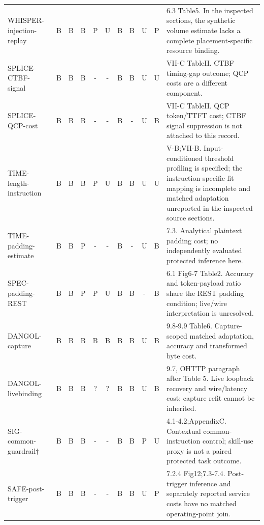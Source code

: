 \begin{longtable}{@{}p{}*{9}{c}p{}@{}}
WHISPER-\allowbreak{}injection-\allowbreak{}replay~\cite{whisperleak2025} & B & B & B & P & U & B & B & U & P & 6.3 Table5. In the inspected sections, the synthetic volume estimate lacks a complete placement-specific resource binding.\\
SPLICE-\allowbreak{}CTBF-\allowbreak{}signal~\cite{spliceleak2026} & B & B & B & - & - & B & B & U & U & VII-C TableII. CTBF timing-gap outcome; QCP costs are a different component.\\
SPLICE-\allowbreak{}QCP-\allowbreak{}cost~\cite{spliceleak2026} & B & B & B & - & - & B & - & U & B & VII-C TableII. QCP token/TTFT cost; CTBF signal suppression is not attached to this record.\\
TIME-\allowbreak{}length-\allowbreak{}instruction~\cite{timewilltell2024} & B & B & B & P & U & B & B & U & U & V-B;VII-B. Input-conditioned threshold profiling is specified; the instruction-specific fit mapping is incomplete and matched adaptation unreported in the inspected source sections.\\
TIME-\allowbreak{}padding-\allowbreak{}estimate~\cite{timewilltell2024} & B & B & P & - & - & B & - & U & B & 7.3. Analytical plaintext padding cost; no independently evaluated protected inference here.\\
SPEC-\allowbreak{}padding-\allowbreak{}REST~\cite{wei2024speculation} & B & B & P & P & U & B & B & - & B & 6.1 Fig6-7 Table2. Accuracy and token-payload ratio share the REST padding condition; live/wire interpretation is unresolved.\\
DANGOL-\allowbreak{}capture~\cite{dangol2026workflow} & B & B & B & B & B & B & B & U & B & 9.8-9.9 Table6. Capture-scoped matched adaptation, accuracy and transformed byte cost.\\
DANGOL-\allowbreak{}livebinding~\cite{dangol2026workflow} & B & B & B & ? & ? & B & B & U & B & 9.7, OHTTP paragraph after Table 5. Live loopback recovery and wire/latency cost; capture refit cannot be inherited.\\
SIG-\allowbreak{}common-\allowbreak{}guardrail$\dagger$~\cite{geng2026sigleak} & B & B & B & - & - & B & B & P & U & 4.1-4.2;AppendixC. Contextual common-instruction control; skill-use proxy is not a paired protected task outcome.\\
SAFE-\allowbreak{}post-\allowbreak{}trigger~\cite{chu2025safekv} & B & B & B & - & - & B & B & U & P & 7.2.4 Fig12;7.3-7.4. Post-trigger inference and separately reported service costs have no matched operating-point join.\\

\end{longtable}
